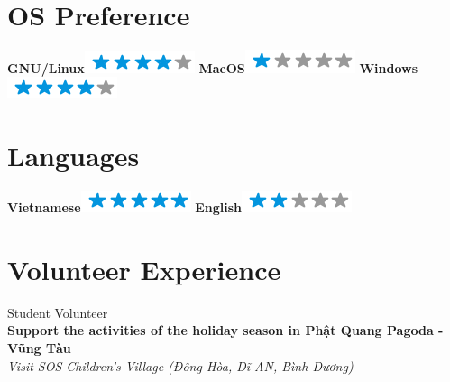 \documentclass[]{friggeri-cv}
\begin{document}
\begin{aside}
~
~
~
  \section{OS Preference}
    \textbf{GNU/Linux}\includegraphics[scale=0.40]{img/4stars.png}
    \textbf{MacOS}\includegraphics[scale=0.40]{img/1stars.png}
    \textbf{Windows}\includegraphics[scale=0.40]{img/4stars.png}
  \section{Languages}
    \textbf{Vietnamese}\includegraphics[scale=0.40]{img/5stars.png}
    \textbf{English}\includegraphics[scale=0.40]{img/2stars.png}
    ~
\end{aside}

\section{Volunteer Experience}
Student Volunteer\\
\textbf{Support the activities of the holiday season in Phật Quang Pagoda - Vũng Tàu}\\
\emph{Visit SOS Children's Village (Đông Hòa, Dĩ AN, Bình Dương)}
\\
\end{document}
